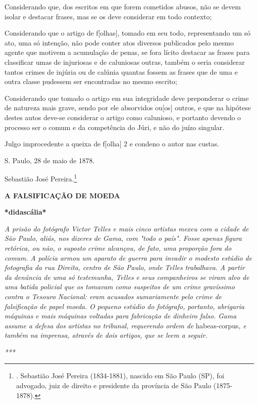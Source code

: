 Considerando que, dos escritos em que forem cometidos abusos, não se
devem isolar e destacar frases, mas se os deve considerar em todo
contexto;

Considerando que o artigo de f{[}olhas{]}, tomado em seu todo,
representando um só ato, uma só intenção, não pode conter atos diversos
publicados pelo mesmo agente que motivem a acumulação de penas, se fora
lícito destacar as frases para classificar umas de injuriosas e de
caluniosas outras, também o seria considerar tantos crimes de injúria ou
de calúnia quantas fossem as frases que de uma e outra classe pudessem
ser encontradas no mesmo escrito;

Considerando que tomado o artigo em sua integridade deve preponderar o
crime de natureza mais grave, sendo por ele absorvidos ou{[}os{]}
outros, e que na hipótese destes autos deve-se considerar o artigo como
calunioso, e portanto devendo o processo ser o comum e da competência do
Júri, e não do juízo singular.

Julgo improcedente a queixa de f{[}olha{]} 2 e condeno o autor nas
custas.

S. Paulo, 28 de maio de 1878.

Sebastião José Pereira.\footnote{. Sebastião José Pereira (1834-1881),
  nascido em São Paulo (SP), foi advogado, juiz de direito e presidente
  da província de São Paulo (1875-1878).}

\protect\hypertarget{Secao_Sem_Titulo-12}{}{}\textbf{A FALSIFICAÇÃO DE
MOEDA}

\textbf{*didascália*}

\emph{A prisão do fotógrafo Victor Telles e mais cinco artistas mexeu
com a cidade de São Paulo, aliás, nos dizeres de Gama, com "todo o
país". Fosse apenas figura retórica, ou não, o suposto crime alcançou,
de fato, uma proporção fora do comum. A polícia armou um aparato de
guerra para invadir o modesto estúdio de fotografia da rua Direita,
centro de São Paulo, onde Telles trabalhava. A partir da denúncia de uma
só testemunha, Telles e seus companheiros se viram alvo de uma batida
policial que os tomavam como suspeitos de um crime gravíssimo contra o
Tesouro Nacional: eram acusados sumariamente pelo crime de falsificação
de papel moeda. O pequeno estúdio do fotógrafo, portanto, abrigaria
máquinas e mais máquinas voltadas para fabricação de dinheiro falso.
Gama assume a defesa dos artistas no tribunal, requerendo ordem de}
habeas-corpus\emph{, e também na imprensa, através de dois artigos, que
se leem a seguir. }

\emph{***}

